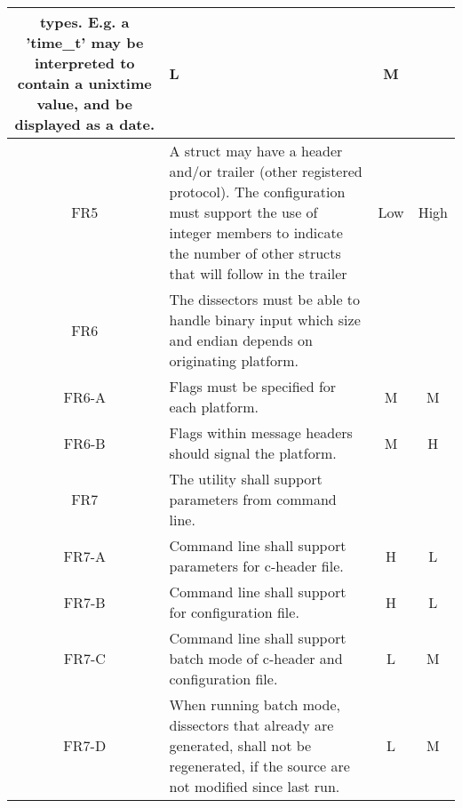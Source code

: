 \begin{table}[ht]
\begin{tabular}{c | p{9cm} | c  c }
		types. E.g. a 'time\_t' may be interpreted to contain a unixtime value,
		and be displayed as a date.
		& L & M \\ \hline
	FR5 & A struct may have a header and/or trailer (other registered
		protocol). The configuration must support the use of integer members to
		indicate the number of other structs that will follow in the trailer
		& Low & High \\ \hline
	FR6 & The dissectors must be able to handle binary input which size
		and endian depends on originating platform.
		& & \\
	FR6-A & Flags must be specified for each platform.
		& M & M \\
	FR6-B & Flags within message headers should signal the platform.
		& M & H \\ \hline
	FR7 & The utility shall support parameters from command line.
		& & \\
	FR7-A & Command line shall support parameters for c-header file.
		& H & L \\
	FR7-B & Command line shall support for configuration file.
		& H & L \\
	FR7-C & Command line shall support batch mode of c-header and
		configuration file.
		& L & M \\
	FR7-D & When running batch mode, dissectors that already are
		generated, shall not be regenerated, if the source are not modified
		since last run.
		& L & M \\ \hline
\end{tabular}
\end{table}

